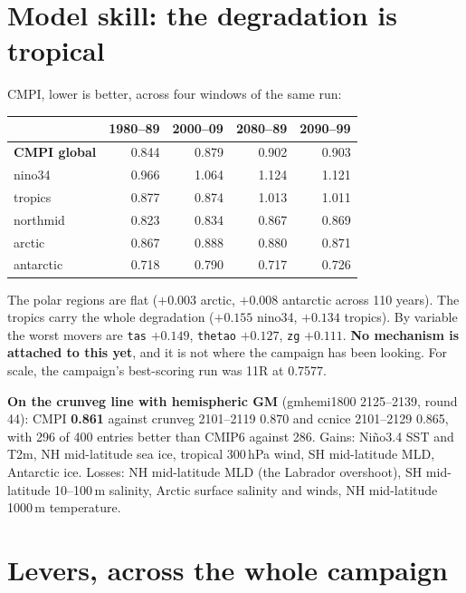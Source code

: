 \documentclass[10pt]{article}
\begin{document}
\section{Model skill: the degradation is tropical}\label{sec:cmpi}

CMPI, lower is better, across four windows of the same run:

\begin{center}\small
\begin{tabular}{lrrrr}
\toprule
 & 1980--89 & 2000--09 & 2080--89 & 2090--99 \\
\midrule
\textbf{CMPI global} & 0.844 & 0.879 & 0.902 & 0.903 \\
\midrule
nino34    & 0.966 & 1.064 & 1.124 & 1.121 \\
tropics   & 0.877 & 0.874 & 1.013 & 1.011 \\
northmid  & 0.823 & 0.834 & 0.867 & 0.869 \\
arctic    & 0.867 & 0.888 & 0.880 & 0.871 \\
antarctic & 0.718 & 0.790 & 0.717 & 0.726 \\
\bottomrule
\end{tabular}
\end{center}

The polar regions are flat ($+0.003$ arctic, $+0.008$ antarctic across 110 years). The
tropics carry the whole degradation ($+0.155$ nino34, $+0.134$ tropics). By variable the
worst movers are \texttt{tas} $+0.149$, \texttt{thetao} $+0.127$, \texttt{zg} $+0.111$.
\textbf{No mechanism is attached to this yet}, and it is not where the campaign has been
looking. For scale, the campaign's best-scoring run was 11R at 0.7577.

\textbf{On the crunveg line with hemispheric GM} (gmhemi1800 2125--2139, round 44): CMPI
\textbf{0.861} against crunveg 2101--2119 0.870 and ccnice 2101--2129 0.865, with 296 of 400
entries better than CMIP6 against 286. Gains: Ni\~no3.4 SST and T2m, NH mid-latitude sea ice,
tropical 300\,hPa wind, SH mid-latitude MLD, Antarctic ice. Losses: NH mid-latitude MLD (the
Labrador overshoot), SH mid-latitude 10--100\,m salinity, Arctic surface salinity and winds, NH
mid-latitude 1000\,m temperature.

\section{Levers, across the whole campaign}\label{sec:levers}
\end{document}
